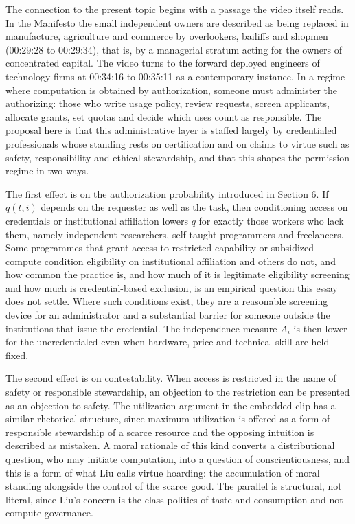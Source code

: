 \documentclass[11pt]{article}
\theoremstyle{plain}
\theoremstyle{definition}
\begin{document}
The connection to the present topic begins with a passage the video itself reads. In the Manifesto the small independent owners are described as being replaced in manufacture, agriculture and commerce by overlookers, bailiffs and shopmen (00:29:28 to 00:29:34), that is, by a managerial stratum acting for the owners of concentrated capital. The video turns to the forward deployed engineers of technology firms at 00:34:16 to 00:35:11 as a contemporary instance. In a regime where computation is obtained by authorization, someone must administer the authorizing: those who write usage policy, review requests, screen applicants, allocate grants, set quotas and decide which uses count as responsible. The proposal here is that this administrative layer is staffed largely by credentialed professionals whose standing rests on certification and on claims to virtue such as safety, responsibility and ethical stewardship, and that this shapes the permission regime in two ways.

The first effect is on the authorization probability introduced in Section 6. If $q(t,i)$ depends on the requester as well as the task, then conditioning access on credentials or institutional affiliation lowers $q$ for exactly those workers who lack them, namely independent researchers, self-taught programmers and freelancers. Some programmes that grant access to restricted capability or subsidized compute condition eligibility on institutional affiliation and others do not, and how common the practice is, and how much of it is legitimate eligibility screening and how much is credential-based exclusion, is an empirical question this essay does not settle. Where such conditions exist, they are a reasonable screening device for an administrator and a substantial barrier for someone outside the institutions that issue the credential. The independence measure $A_i$ is then lower for the uncredentialed even when hardware, price and technical skill are held fixed.

The second effect is on contestability. When access is restricted in the name of safety or responsible stewardship, an objection to the restriction can be presented as an objection to safety. The utilization argument in the embedded clip has a similar rhetorical structure, since maximum utilization is offered as a form of responsible stewardship of a scarce resource and the opposing intuition is described as mistaken. A moral rationale of this kind converts a distributional question, who may initiate computation, into a question of conscientiousness, and this is a form of what Liu calls virtue hoarding: the accumulation of moral standing alongside the control of the scarce good. The parallel is structural, not literal, since Liu's concern is the class politics of taste and consumption and not compute governance.
\end{document}
